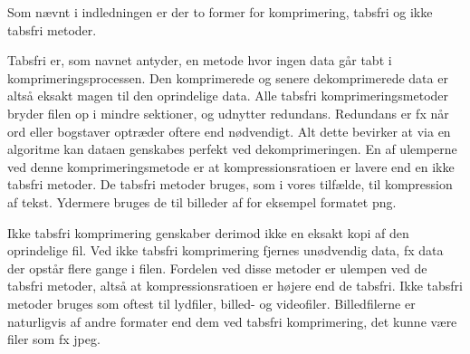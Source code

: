 Som nævnt i indledningen er der to former for komprimering, tabsfri og ikke tabsfri metoder. 

Tabsfri er, som navnet antyder, en metode hvor ingen data går tabt i komprimeringsprocessen. Den komprimerede og senere dekomprimerede data er altså eksakt magen til den oprindelige data. Alle tabsfri komprimeringsmetoder bryder filen op i mindre sektioner, og udnytter redundans. Redundans er fx når ord eller bogstaver optræder oftere end nødvendigt. Alt dette bevirker at via en algoritme kan dataen genskabes perfekt ved dekomprimeringen. En af ulemperne ved denne komprimeringsmetode er at kompressionsratioen er lavere end en ikke tabsfri metoder\cite{wisegeek}. De tabsfri metoder bruges, som i vores tilfælde, til kompression af tekst. Ydermere bruges de til billeder af for eksempel formatet png. 

Ikke tabsfri komprimering genskaber derimod ikke en eksakt kopi af den oprindelige fil. Ved ikke tabsfri komprimering fjernes unødvendig data, fx data der opstår flere gange i filen. Fordelen ved disse metoder er ulempen ved de tabsfri metoder, altså at kompressionsratioen er højere end de tabsfri. Ikke tabsfri metoder bruges som oftest til lydfiler, billed- og videofiler\cite{maximum}. Billedfilerne er naturligvis af andre formater end dem ved tabsfri komprimering, det kunne være filer som fx jpeg.
